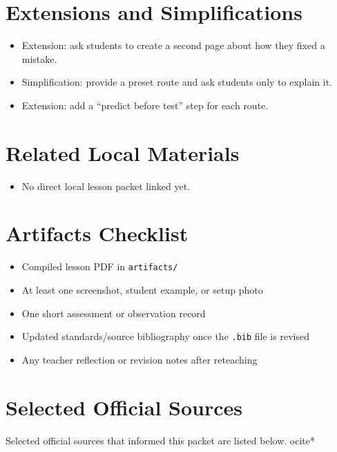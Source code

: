 \documentclass[11pt]{article}
\begin{document}
\section*{Extensions and Simplifications}
\begin{itemize}[leftmargin=*]
\item Extension: ask students to create a second page about how they fixed a mistake.
\item Simplification: provide a preset route and ask students only to explain it.
\item Extension: add a “predict before test” step for each route.
\end{itemize}

\section*{Related Local Materials}
\begin{itemize}[leftmargin=*]
\item No direct local lesson packet linked yet.
\end{itemize}

\section*{Artifacts Checklist}
\begin{itemize}[leftmargin=*]
\item Compiled lesson PDF in \texttt{artifacts/}
\item At least one screenshot, student example, or setup photo
\item One short assessment or observation record
\item Updated standards/source bibliography once the \texttt{.bib} file is revised
\item Any teacher reflection or revision notes after reteaching
\end{itemize}

\section*{Selected Official Sources}
Selected official sources that informed this packet are listed below.
ocite{*}



\end{document}
